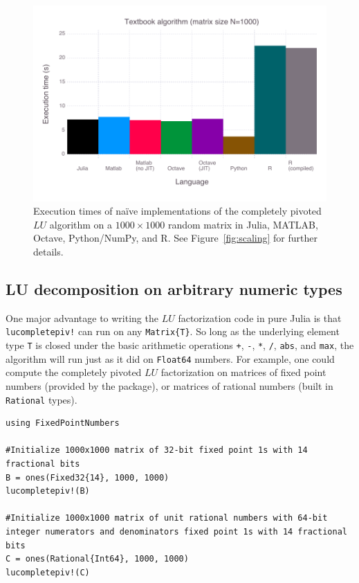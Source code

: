 \begin{figure}
	\includegraphics[width=\columnwidth]{data/fig-lang}
	\caption{Execution times of na\"ive implementations of the
	completely pivoted $LU$ algorithm on a $1000\times1000$ random matrix
	in Julia, MATLAB, Octave, Python/NumPy, and R. See Figure~\ref{fig:scaling}
	for further details.}
	\label{fig:naivelangs}
\end{figure}



\subsection{LU decomposition on arbitrary numeric types}

One major advantage to writing the $LU$ factorization code in pure Julia is
that \lstinline|lucompletepiv!| can run on any \lstinline|Matrix{T}|. So long
as the underlying element type \lstinline|T| is closed under the basic
arithmetic operations \lstinline|+|, \lstinline|-|, \lstinline|*|,
\lstinline|/|, \lstinline|abs|, and \lstinline|max|, the algorithm will run
just as it did on \lstinline|Float64| numbers. For example, one could compute
the completely pivoted $LU$ factorization on matrices of fixed point numbers
(provided by the  package), or matrices of
rational numbers (built in \lstinline|Rational| types).

\begin{lstlisting}
using FixedPointNumbers

#Initialize 1000x1000 matrix of 32-bit fixed point 1s with 14 fractional bits
B = ones(Fixed32{14}, 1000, 1000)
lucompletepiv!(B)

#Initialize 1000x1000 matrix of unit rational numbers with 64-bit integer numerators and denominators fixed point 1s with 14 fractional bits
C = ones(Rational{Int64}, 1000, 1000)
lucompletepiv!(C)
\end{lstlisting}

